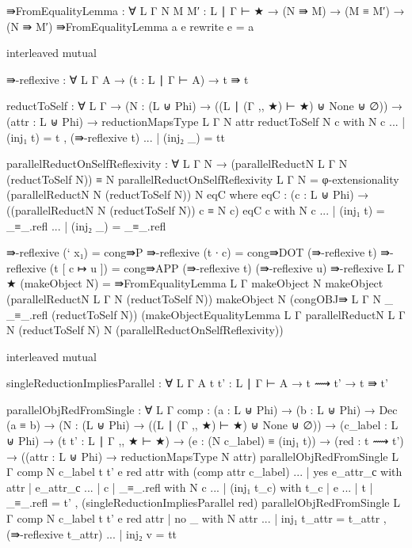 {\begin{code}
⇛FromEqualityLemma : ∀ {L Γ} {N M M′ : L ∣ Γ ⊢ ★} → (N ⇛ M) → (M ≡ M′) → (N ⇛ M′)
⇛FromEqualityLemma a e rewrite e = a

interleaved mutual

  ⇛-reflexive : ∀ {L Γ A} → (t : L ∣ Γ ⊢ A) → t ⇛ t

  reductToSelf : ∀ {L Γ} → (N : (L ⊎ Phi) → ((L ∣ (Γ ,, ★) ⊢ ★) ⊎ None ⊎ ∅)) → (attr : L ⊎ Phi) → reductionMapsType {L} {Γ} N attr
  reductToSelf N c with N c
  ... | (inj₁ t) = t , (⇛-reflexive t)
  ... | (inj₂ _) = tt

  parallelReductOnSelfReflexivity : ∀ {L Γ N} → (parallelReductN {L} {Γ} N (reductToSelf N)) ≡ N
  parallelReductOnSelfReflexivity {L} {Γ} {N} = φ-extensionality (parallelReductN N (reductToSelf N)) N eqC where
    eqC : (c : L ⊎ Phi) → ((parallelReductN N (reductToSelf N)) c ≡ N c)
    eqC c with N c
    ... | (inj₁ t) = _≡_.refl
    ... | (inj₂ _) = _≡_.refl

  ⇛-reflexive (` x₁) = cong⇛P
  ⇛-reflexive (t ∙ c) = cong⇛DOT (⇛-reflexive t)
  ⇛-reflexive (t [ c ↦ u ]) = cong⇛APP (⇛-reflexive t) (⇛-reflexive u)
  ⇛-reflexive {L} {Γ} {★} (makeObject N) = 
    ⇛FromEqualityLemma {L} {Γ}
      {makeObject N}
      {makeObject (parallelReductN {L} {Γ} N (reductToSelf N))}
      {makeObject N}
      (congOBJ⇛ {L} {Γ} {N} {_} {_≡_.refl} (reductToSelf N))
      (makeObjectEqualityLemma {L} {Γ} {parallelReductN {L} {Γ} N (reductToSelf N)} {N} (parallelReductOnSelfReflexivity))

interleaved mutual

  singleReductionImpliesParallel : ∀ {L Γ A} {t t' : L ∣ Γ ⊢ A} → t ⟿ t' → t ⇛ t'

  parallelObjRedFromSingle : ∀ {L Γ} {comp : (a : L ⊎ Phi) → (b : L ⊎ Phi) → Dec (a ≡ b)}
    → (N : (L ⊎ Phi) → ((L ∣ (Γ ,, ★) ⊢ ★) ⊎ None ⊎ ∅)) 
    → (c_label : L ⊎ Phi) 
    → (t t' : L ∣ Γ ,, ★ ⊢ ★) 
    → (e : (N c_label) ≡ (inj₁ t)) 
    → (red : t ⟿ t') 
    → ((attr : L ⊎ Phi) → reductionMapsType N attr)
  parallelObjRedFromSingle {L} {Γ} {comp} N c_label t t' e red attr with (comp attr c_label)
  ... | yes e_attr_с with attr | e_attr_с
  ...   | c | _≡_.refl with N c
  ...     | (inj₁ t_c) with t_c | e
  ...       | t | _≡_.refl = t' , (singleReductionImpliesParallel red)
  parallelObjRedFromSingle {L} {Γ} {comp} N c_label t t' e red attr
      | no _ with N attr
  ...   | inj₁ t_attr = t_attr , (⇛-reflexive t_attr)
  ...   | inj₂ v = tt



\end{code}}
